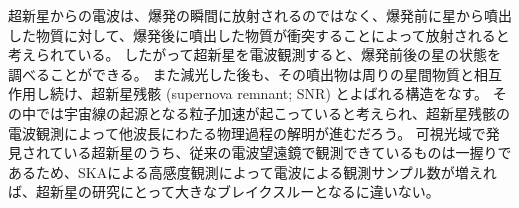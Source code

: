 超新星からの電波は、爆発の瞬間に放射されるのではなく、爆発前に星から噴出した物質に対して、爆発後に噴出した物質が衝突することによって放射されると考えられている。
したがって超新星を電波観測すると、爆発前後の星の状態を調べることができる。
また減光した後も、その噴出物は周りの星間物質と相互作用し続け、超新星残骸 (supernova remnant; SNR) とよばれる構造をなす。
その中では宇宙線の起源となる粒子加速が起こっていると考えられ、超新星残骸の電波観測によって他波長にわたる物理過程の解明が進むだろう。
可視光域で発見されている超新星のうち、従来の電波望遠鏡で観測できているものは一握りであるため、SKAによる高感度観測によって電波による観測サンプル数が増えれば、超新星の研究にとって大きなブレイクスルーとなるに違いない。
